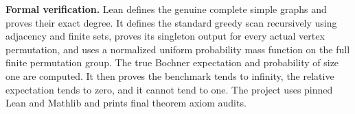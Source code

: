 \documentclass[11pt]{article}
\begin{document}
\medskip\noindent\textbf{Formal verification.} Lean defines the genuine complete simple graphs and proves their exact degree. It defines the standard greedy scan recursively using adjacency and finite sets, proves its singleton output for every actual vertex permutation, and uses a normalized uniform probability mass function on the full finite permutation group. The true Bochner expectation and probability of size one are computed. It then proves the benchmark tends to infinity, the relative expectation tends to zero, and it cannot tend to one. The project uses pinned Lean and Mathlib and prints final theorem axiom audits.
\end{document}
